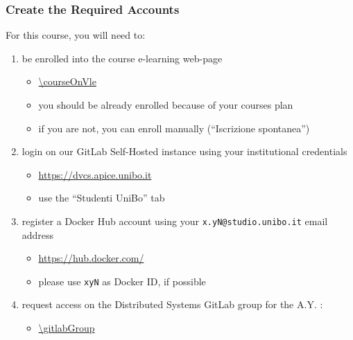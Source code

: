 \documentclass[presentation]{beamer}\mode<presentation>{\usetheme{AMSBolognaFC}}
\begin{document}
\begin{frame}\label{configure-accounts}
\frametitle{Create the Required Accounts}

    For this course, you will need to:
    \begin{enumerate}
        \item be enrolled into the course e-learning web-page
        \begin{itemize}
            \item \url{\courseOnVle}
            \item you should be already enrolled because of your courses plan
            \item if you are not, you can enroll manually (``Iscrizione spontanea'')
        \end{itemize}

        \item login on our GitLab Self-Hosted instance using your \alert{institutional credentials}
        \begin{itemize}
            \item \url{https://dvcs.apice.unibo.it} 
            \item use the ``Studenti UniBo'' tab
        \end{itemize}

        \item register a Docker Hub account using your \alert{\texttt{x.yN@studio.unibo.it}} email address
        \begin{itemize}
            \item \url{https://hub.docker.com/}
            \item please use \texttt{xyN} as Docker ID, if possible
        \end{itemize}

        \item request access on the Distributed Systems GitLab group for the A.Y. \academicYear:
        \begin{itemize}
            \item \url{\gitlabGroup}
        \end{itemize}

    \end{enumerate}

\end{frame}
\end{document}
